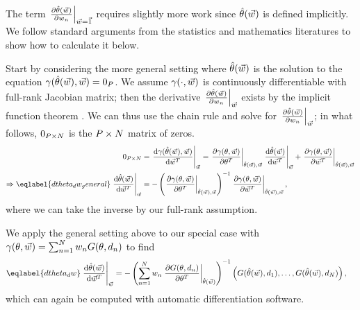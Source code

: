 The term $\fracat{\partial \thetahat(\w)}{\partial w_n}{\w = \onevec}$ requires
slightly more work since $\thetahat(\w)$ is defined implicitly. We follow
standard arguments from the statistics and mathematics literatures
\citep{krantz2012implicit, hampel1974influence} to show how to calculate it
below.

Start by considering the more general setting where $\thetahat(\w)$ is the
solution to the equation $\gamma(\thetahat(\w), \w) =  \zP $. We assume
$\gamma(\cdot, \w)$ is continuously differentiable with full-rank Jacobian
matrix; then the derivative $\fracat{\partial \thetahat(\w)}{\partial w_n}{\w}$
exists by the implicit function theorem \citep[Theorem
3.3.1]{krantz2012implicit}. We can thus use the chain rule and solve for
$\fracat{\partial \thetahat(\w)}{\partial w_n}{\w}$; in what follows, $\zPN$ is
the $\P \times N$ matrix of zeros.
%
\begin{align}
	\zPN &= \fracat{\dee \gamma(\thetahat(\w), \w)}{\dee \w^T}{\w}
		= \fracat{\partial \gamma(\theta, \w)}{\partial \theta^T}{\thetahat(\w), \w}
\fracat{\dee \thetahat(\w)}{\dee \w^{T}}{\w} +
\fracat{\partial \gamma(\theta, \w)}{\partial \w^T}{\thetahat(\w), \w} \\
\Rightarrow
	\eqlabel{dtheta_dw_general}
	\fracat{\dee \thetahat(\w)}{\dee \w^{T}}{\w}
		&= -\left( \fracat{\partial \gamma(\theta, \w)}
                 	  {\partial \theta^T}{\thetahat(\w), \w} \right)^{-1}
			\fracat{\partial \gamma(\theta, \w)}{\partial \w^T}{\thetahat(\w), \w},
\end{align}
%
where we can take the inverse by our full-rank assumption.

We apply the general setting above to our special case with $\gamma(\theta, \w) =
\sumn w_n G(\theta, \d_{n})$ to find
%
\begin{align} \eqlabel{dtheta_dw}
	\fracat{\dee \thetahat(\w)}{\dee \w^T}{\w}
		&= -\left( \sumn w_n
        			\fracat{\partial G(\theta, \d_{n})}
               		{\partial \theta^T}{\thetahat(\w)} \right)^{-1}
			\left(
   				 G(\thetahat(\w), \d_{1}), \ldots, G(\thetahat(\w), \d_{N})
			\right),
\end{align}
%
which can again be computed with automatic differentiation software.
